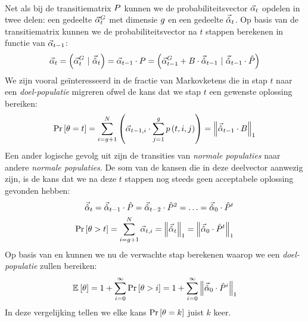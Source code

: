 \paragraph{}
Net als bij de transitiematrix $P$ kunnen we de probabiliteitsvector $\vec{\alpha}_{t}$ opdelen in twee delen: een gedeelte $\vec{\alpha}^G_{t}$ met dimensie $g$ en een gedeelte $\vec{\hat{\alpha}}_{t}$. Op basis van de transitiematrix kunnen we de probabiliteitsvector na $t$ stappen berekenen in functie van $\vec{\alpha}_{t-1}$:
\begin{equation}
\probdistmeta{t}=\brak{\probdistgoalmeta{t}\ |\ \probdistnormmeta{t}}=\probdistmeta{t-1}\cdot\transmat=\brak{\probdistgoalmeta{t-1}+\bridgemat\cdot\probdistnormmeta{t-1}\ |\ \probdistnormmeta{t-1}\cdot\removmat}
\eqnlab{oneStepTransition}
\end{equation}
We zijn vooral ge\"interesseerd in de fractie van Markovketens die in stap $t$ naar een \emph{doel-populatie} migreren ofwel de kans dat we stap $t$ een gewenste oplossing bereiken:
\begin{equation}
\Prob{\hittime=t}=\displaystyle\sum_{i=\ntarpop+1}^{N}\brak{\probdistmeta{t-1,i}\cdot\displaystyle\sum_{j=1}^{\ntarpop}\fun{p}{t,i,j}}=\dabs[1]{\probdistnormmeta{t-1}\cdot \bridgemat}
\eqnlab{exhaust}
\end{equation}
Een ander logische gevolg uit  zijn de transities van \emph{normale populaties} naar andere \emph{normale populaties}. De som van de kansen die in deze deelvector aanwezig zijn, is de kans dat we na deze $t$ stappen nog steeds geen acceptabele oplossing gevonden hebben:
\begin{eqnarray}
\probdistnormmeta{t}=\probdistnormmeta{t-1}\cdot\removmat=\probdistnormmeta{t-2}\cdot\removmat^2=\ldots=\probdistnormmeta{0}\cdot\removmat^t\eqnlab{remainder}\\
\Prob{\hittime>t}=\displaystyle\sum_{i=\ntarpop+1}^{\npop}\probdistmeta{t,i}=\dabs[1]{\probdistnormmeta{t}}=\dabs[1]{\probdistnormmeta{0}\cdot\removmat^t}\eqnlab{nothit}
\end{eqnarray}
Op basis van  en  kunnen we nu de verwachte stap berekenen waarop we een \emph{doel-populatie} zullen bereiken:
\begin{equation}
\mean{\hittime}=1+\displaystyle\sum_{i=0}^{\infty}{\Prob{\hittime>i}}=1+\displaystyle\sum_{i=0}^{\infty}{\dabs[1]{\probdistnormmeta{0}\cdot\removmat^i}}
\eqnlab{meanHit}
\end{equation}
In deze vergelijking tellen we elke kans $\Pr\left[\theta=k\right]$ juist $k$ keer.
